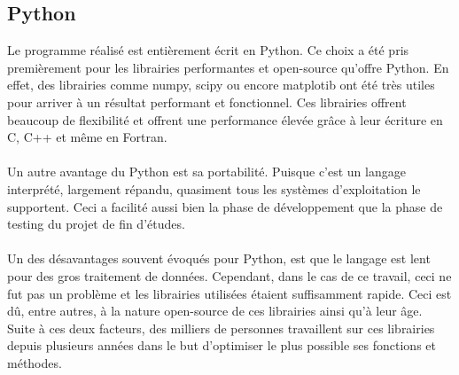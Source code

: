 \documentclass[11pt]{article}
\begin{document}
\subsection{Python}

Le programme réalisé est entièrement écrit en Python.
Ce choix a été pris premièrement pour les librairies performantes et open-source qu'offre Python.
En effet, des librairies comme numpy, scipy ou encore matplotib ont été très utiles pour arriver à un résultat performant et fonctionnel.
Ces librairies offrent beaucoup de flexibilité et offrent une performance élevée grâce à leur écriture en C, C++ et même en Fortran.\\
\\
Un autre avantage du Python est sa portabilité.
Puisque c'est un langage interprété, largement répandu, quasiment tous les systèmes d'exploitation le supportent.
Ceci a facilité aussi bien la phase de développement que la phase de testing du projet de fin d'études.\\
\\
Un des désavantages souvent évoqués pour Python, est que le langage est lent pour des gros traitement de données.
Cependant, dans le cas de ce travail, ceci ne fut pas un problème et les librairies utilisées étaient suffisamment rapide.
Ceci est dû, entre autres, à la nature open-source de ces librairies ainsi qu'à leur âge.
Suite à ces deux facteurs, des milliers de personnes travaillent sur ces librairies depuis plusieurs années dans le but d'optimiser le plus possible ses fonctions et méthodes.

\end{document}
